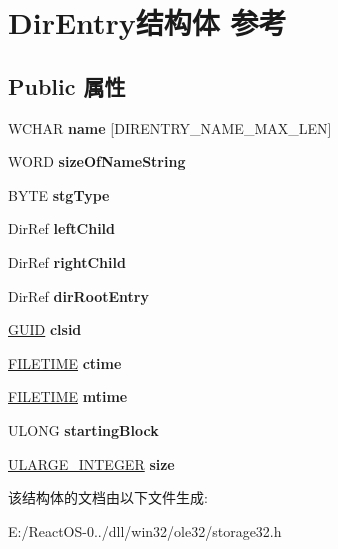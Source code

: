 \hypertarget{struct_dir_entry}{}\section{Dir\+Entry结构体 参考}
\label{struct_dir_entry}
\subsection*{Public 属性}
\begin{DoxyCompactItemize}
\item 
\mbox{\label{struct_dir_entry_ab89c48c6841a4d33d85a882aa6bd81e9}} 
W\+C\+H\+AR {\bfseries name} \mbox{[}D\+I\+R\+E\+N\+T\+R\+Y\+\_\+\+N\+A\+M\+E\+\_\+\+M\+A\+X\+\_\+\+L\+EN\mbox{]}
\item 
\mbox{\label{struct_dir_entry_a9ada45e3e76f6a77ea6d75cb7842aeec}} 
W\+O\+RD {\bfseries size\+Of\+Name\+String}
\item 
\mbox{\label{struct_dir_entry_a2594029cd7ad8e8922aa6f3ea64e4979}} 
B\+Y\+TE {\bfseries stg\+Type}
\item 
\mbox{\label{struct_dir_entry_aeac8e0eaa3120918e3ad4819be3d15d4}} 
Dir\+Ref {\bfseries left\+Child}
\item 
\mbox{\label{struct_dir_entry_a40dc16e9049d7ef9b5a696d0c61fff82}} 
Dir\+Ref {\bfseries right\+Child}
\item 
\mbox{\label{struct_dir_entry_a2510549e6b43d4c59dc2f419894d06c5}} 
Dir\+Ref {\bfseries dir\+Root\+Entry}
\item 
\mbox{\label{struct_dir_entry_a283c05770168ac326703a89072122b59}} 
\hyperlink{interface_g_u_i_d}{G\+U\+ID} {\bfseries clsid}
\item 
\mbox{\label{struct_dir_entry_a766308ea97c23215248b3aea8e1a538d}} 
\hyperlink{struct___f_i_l_e_t_i_m_e}{F\+I\+L\+E\+T\+I\+ME} {\bfseries ctime}
\item 
\mbox{\label{struct_dir_entry_af52d0d833b5d83e2852c80de03f9902f}} 
\hyperlink{struct___f_i_l_e_t_i_m_e}{F\+I\+L\+E\+T\+I\+ME} {\bfseries mtime}
\item 
\mbox{\label{struct_dir_entry_a13b72591df57f391db20b9c53c96a7c8}} 
U\+L\+O\+NG {\bfseries starting\+Block}
\item 
\mbox{\label{struct_dir_entry_a73ce10f5040236a904b8be515dd0848c}} 
\hyperlink{struct___u_l_a_r_g_e___i_n_t_e_g_e_r}{U\+L\+A\+R\+G\+E\+\_\+\+I\+N\+T\+E\+G\+ER} {\bfseries size}
\end{DoxyCompactItemize}


该结构体的文档由以下文件生成\+:\begin{DoxyCompactItemize}
\item 
E\+:/\+React\+O\+S-\/0../dll/win32/ole32/storage32.\+h\end{DoxyCompactItemize}
